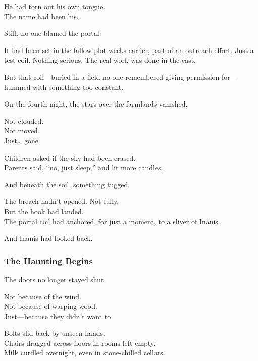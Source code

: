\documentclass[12pt]{article}
\begin{document}
\vspace{0.5em}
He had torn out his own tongue.\\
The name had been his.

\vspace{0.5em}
Still, no one blamed the portal.

\vspace{0.5em}
It had been set in the fallow plot weeks earlier, part of an outreach effort. Just a test coil. Nothing serious. The real work was done in the east.

\vspace{0.5em}
But that coil---buried in a field no one remembered giving permission for---hummed with something too constant.

\vspace{0.5em}
On the fourth night, the stars over the farmlands vanished.

\vspace{0.5em}
Not clouded.\\
Not moved.\\
Just\ldots{} gone.

\vspace{0.5em}
Children asked if the sky had been erased.\\
Parents said, ``no, just sleep,'' and lit more candles.

\vspace{0.5em}
And beneath the soil, something tugged.

\vspace{0.5em}
The breach hadn’t opened. Not fully.\\
But the hook had landed.\\
The portal coil had anchored, for just a moment, to a sliver of Inanis.

\vspace{0.5em}
And Inanis had looked back.

\dotfill

\subsubsection*{The Haunting Begins}

The doors no longer stayed shut.

\vspace{0.5em}
Not because of the wind.\\
Not because of warping wood.\\
Just---because they didn’t want to.

\vspace{0.5em}
Bolts slid back by unseen hands.\\
Chairs dragged across floors in rooms left empty.\\
Milk curdled overnight, even in stone-chilled cellars.
\end{document}
